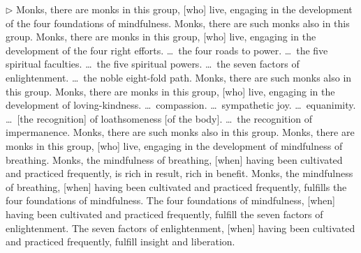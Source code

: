 \addtocounter{sennum}{-4}
$\triangleright$  Monks, there are monks in this group, [who] live, engaging in the development of the four foundations of mindfulness. Monks, there are such monks also in this group. Monks, there are monks in this group, [who] live, engaging in the development of the four right efforts. \ldots\ the four roads to power. \ldots\ the five spiritual faculties. \ldots\ the five spiritual powers. \ldots\ the seven factors of enlightenment. \ldots\ the noble eight-fold path. Monks, there are such monks also in this group.  Monks, there are monks in this group, [who] live, engaging in the development of loving-kindness. \ldots\ compassion. \ldots\ sympathetic joy. \ldots\ equanimity. \ldots\ [the recognition] of loathsomeness [of the body]. \ldots\ the recognition of impermanence. Monks, there are such monks also in this group.  Monks, there are monks in this group, [who] live, engaging in the development of mindfulness of breathing.  Monks, the mindfulness of breathing, [when] having been cultivated and practiced frequently, is rich in result, rich in benefit. Monks, the mindfulness of breathing, [when] having been cultivated and practiced frequently, fulfills the four foundations of mindfulness. The four foundations of mindfulness, [when] having been cultivated and practiced frequently, fulfill the seven factors of enlightenment. The seven factors of enlightenment, [when] having been cultivated and practiced frequently, fulfill insight and liberation.\\

